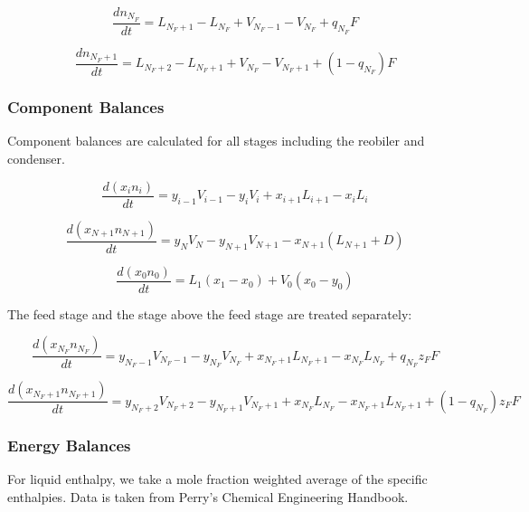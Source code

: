 \begin{equation}
    \frac{dn_{N_F}}{dt} = L_{N_F+1}-L_{N_F} + V_{N_F-1}-V_{N_F} + q_{N_F}F   
\end{equation}

\begin{equation}
   \frac{dn_{N_F+1}}{dt} = L_{N_F+2}-L_{N_F+1} + V_{N_F}-V_{N_F+1} + (1-q_{N_F})F 
\end{equation}


\subsubsection{Component Balances}

Component balances are calculated for all stages including the reobiler and condenser.

\begin{equation}
   \frac{d(x_{i} n_{i})}{dt}= y_{i-1}V_{i-1} -y_iV_i + x_{i+1}L_{i+1} - x_{i}L_i 
\end{equation}

\begin{equation}
    \frac{d(x_{N+1} n_{N+1})}{dt}  = y_NV_N - y_{N+1}V_{N+1} - x_{N+1}(L_{N+1} + D) 
\end{equation}


\begin{equation}
     \frac{d(x_{0} n_{0})}{dt} = L_1(x_1-x_0) + V_0(x_0-y_0) 
\end{equation}

The  feed stage and the stage above the feed stage are treated separately:

\begin{equation}
 \frac{d(x_{N_F} n_{N_F})}{dt}  = y_{N_F-1}V_{N_F-1} -y_{N_F}V_{N_F} + x_{N_F+1}L_{N_F+1} - x_{N_F}L_{N_F} + q_{N_F}z_FF   
\end{equation}

\begin{equation}
    \frac{d(x_{N_F+1} n_{N_F+1})}{dt} = y_{N_F+2}V_{N_F+2} -y_{N_F+1}V_{N_F+1} + x_{N_F}L_{N_F} - x_{N_F+1}L_{N_F+1} + (1-q_{N_F})z_FF 
\end{equation}


\subsubsection{Energy Balances}

For liquid enthalpy, we take a mole fraction weighted average of the specific enthalpies. Data is taken from Perry’s Chemical Engineering Handbook.


